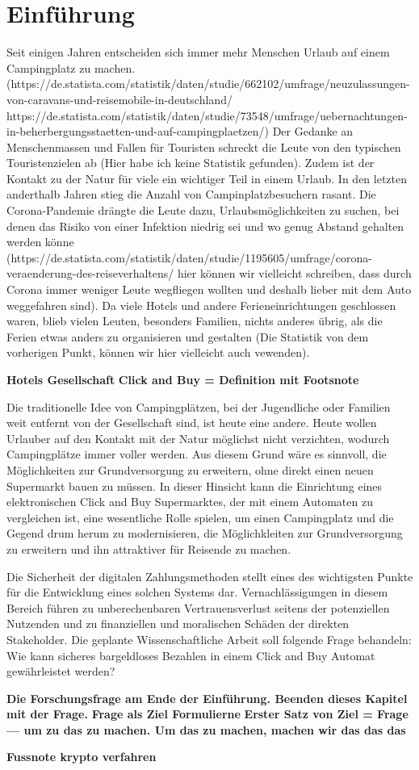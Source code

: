 \section{Einführung}


Seit einigen Jahren entscheiden sich immer mehr Menschen Urlaub auf einem Campingplatz 
zu machen. (https://de.statista.com/statistik/daten/studie/662102/umfrage/neuzulassungen-von-caravans-und-reisemobile-in-deutschland/
https://de.statista.com/statistik/daten/studie/73548/umfrage/uebernachtungen-in-beherbergungsstaetten-und-auf-campingplaetzen/) 
Der Gedanke an Menschenmassen und Fallen für Touristen schreckt die Leute von
den typischen Touristenzielen ab (Hier habe ich keine Statistik gefunden). Zudem ist der Kontakt zu der Natur für viele ein wichtiger
Teil in einem Urlaub. In den letzten anderthalb Jahren stieg die Anzahl von Campinplatzbesuchern
rasant. Die Corona-Pandemie drängte die Leute dazu, Urlaubsmöglichkeiten zu suchen, bei denen
das Risiko von einer Infektion niedrig sei und wo genug Abstand gehalten werden könne (https://de.statista.com/statistik/daten/studie/1195605/umfrage/corona-veraenderung-des-reiseverhaltens/
 hier können wir vielleicht schreiben, dass durch Corona immer weniger Leute wegfliegen wollten und deshalb lieber mit dem Auto weggefahren sind). 
Da viele 
Hotels und andere Ferieneinrichtungen geschlossen waren, blieb vielen Leuten, besonders Familien,
nichts anderes übrig, als die Ferien etwas anders zu organisieren und gestalten (Die Statistik von dem vorherigen Punkt, können wir hier vielleicht auch vewenden).


\textbf{Hotels Gesellschaft}
\textbf{Click and Buy = Definition mit Footsnote}


Die traditionelle Idee von Campingplätzen, bei der Jugendliche oder Familien weit entfernt von der 
Gesellschaft sind, ist heute eine andere. Heute wollen Urlauber auf den Kontakt mit der Natur
möglichst nicht verzichten, wodurch Campingplätze immer voller werden. Aus diesem Grund wäre es
sinnvoll, die Möglichkeiten zur Grundversorgung zu erweitern, ohne direkt einen neuen Supermarkt
bauen zu müssen. In dieser Hinsicht kann die Einrichtung eines elektronischen Click and Buy
Supermarktes, der mit einem Automaten zu vergleichen ist, eine wesentliche Rolle spielen, um 
einen Campingplatz und die Gegend drum herum zu modernisieren, die Möglichkleiten zur Grundversorgung 
zu erweitern und ihn attraktiver für Reisende zu machen.

Die Sicherheit der digitalen Zahlungsmethoden stellt eines des wichtigsten Punkte für die Entwicklung
eines solchen Systems dar. Vernachlässigungen in diesem Bereich führen zu unberechenbaren Vertrauensverlust 
seitens der potenziellen Nutzenden und zu finanziellen und moralischen Schäden der direkten
Stakeholder. Die geplante Wissenschaftliche Arbeit soll folgende Frage behandeln:
Wie kann sicheres bargeldloses Bezahlen in einem Click and Buy Automat gewährleistet werden? 

\textbf{Die Forschungsfrage am Ende der Einführung. Beenden dieses Kapitel mit der Frage.} 
\textbf{Frage als Ziel Formulierne}
\textbf{Erster Satz von Ziel = Frage --- um zu das zu machen. Um das zu machen, machen wir das das das}

\textbf{Fussnote krypto verfahren}


